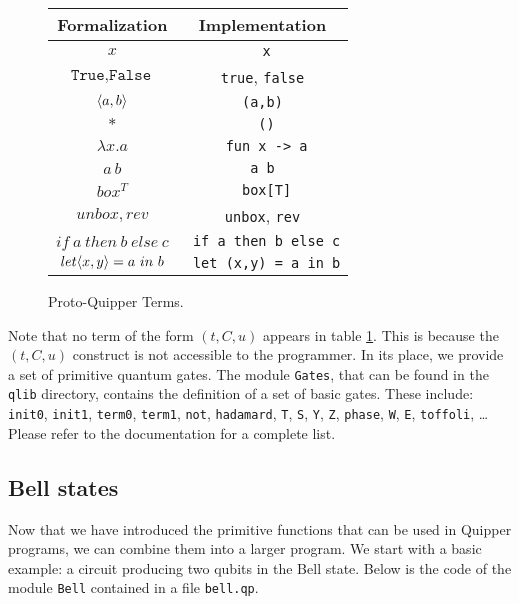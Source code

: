\begin{figure}[!ht]
\begin{center}
\renewcommand{\arraystretch}{1.4}
\begin{tabular}{|c|c|}
  \hline
  \textbf{Formalization}          & \textbf{Implementation} \\\hline
  $x$                             & \verb# x# \\\hline
  $\texttt{True}, \texttt{False}$ & \verb#true#, \verb#false# \\\hline
  $\langle a, b \rangle$                   & \verb# (a,b) # \\\hline
  $*$                             & \verb# ()# \\\hline
  $\lambda x.a$                   & \verb# fun x -> a# \\\hline
  $a \, b$                        & \verb#a b# \\\hline
  $box^T$                         & \verb# box[T]# \\\hline
  $unbox, rev$                    & \verb#unbox#, \verb#rev# \\\hline
  $if ~a~ then ~b~ else ~c$       & \verb# if a then b else c# \\\hline
  $let \langle x, y \rangle = a ~in~ b$    & \verb# let (x,y) = a in b# \\\hline
\end{tabular}
\end{center}
\caption{Proto-Quipper Terms.}
\label{terms}
\end{figure}

Note that no term of the form $(t,C,u)$ appears in table 
\hyperref[terms]{\ref*{terms}}. This is because the $(t,C,u)$ construct is 
not accessible to the programmer. In its place, we provide a set of 
primitive quantum gates. The module \verb#Gates#, that can be found in the 
\verb#qlib# directory, contains the definition of a set of basic gates. 
These include: \verb#init0#, \verb#init1#, \verb#term0#, \verb#term1#, 
\verb#not#, \verb#hadamard#, \verb#T#, \verb#S#, \verb#Y#, \verb#Z#, 
\verb#phase#, \verb#W#, \verb#E#, \verb#toffoli#, \ldots Please refer to 
the documentation for a complete list.

\subsection{Bell states}
\label{ssec-quipper-by-e}

Now that we have introduced the primitive functions that can be used in Quipper programs, we can combine them into a larger program. We start with 
a basic example: a circuit producing two qubits in the Bell state. Below is
the code of the module \verb#Bell# contained in a file \verb#bell.qp#.

